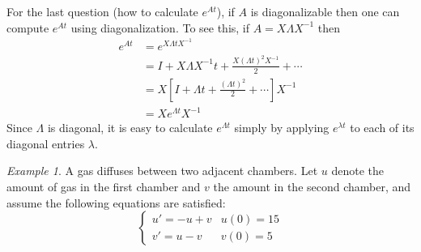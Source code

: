 \documentclass[11pt,oneside]{amsbook}
\theoremstyle{definition}
\theoremstyle{plain}
\theoremstyle{definition}
\theoremstyle{remark}
\newtheorem{example}[theorem]{Example}
\numberwithin{equation}{section}
\numberwithin{figure}{section}
\begin{document}
For the last question (how to calculate $e^{At}$), if $A$ is diagonalizable then one can compute $e^{At}$ using diagonalization. To see this, if $A=X\Lambda X^{-1}$ then
\begin{align*}
  e^{At}&=e^{X\Lambda t X^{-1}}\\
        &=I+X\Lambda X^{-1}t+\frac{X(\Lambda t)^2X^{-1}}{2}+\cdots\\
        &=X\left[I+\Lambda t+\frac{(\Lambda t)^2}{2}+\cdots\right]X^{-1}\\
        &=Xe^{\Lambda t}X^{-1}
\end{align*}
Since $\Lambda$ is diagonal, it is easy to calculate $e^{\Lambda t}$ simply by applying $e^{\lambda t}$ to each of its diagonal entries $\lambda$.

\begin{example}
  A gas diffuses between two adjacent chambers. Let $u$ denote the amount of gas in the first chamber and $v$ the amount in the second chamber, and assume the following equations are satisfied:
  \[\begin{cases}
      u'=-u+v & u(0)=15\\
      v'=u-v & v(0)=5
    \end{cases}
  \]
  

\end{example}
\end{document}
